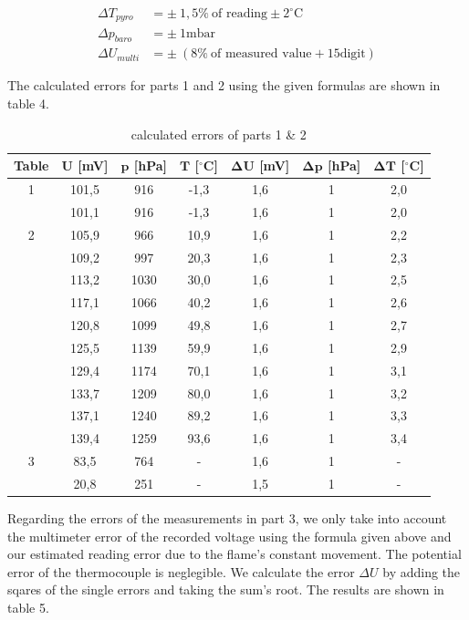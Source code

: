 \documentclass{article}
\begin{document}
\begin{equation}
    \begin{split}
        \Delta T_{pyro} &= \pm \ 1,5 \% \ \text{of reading} \pm 2^{\circ}\text{C} \\
        \Delta p_{baro} &= \pm \ 1 \text{mbar} \\
        \Delta U_{multi} &= \pm \ (8\% \ \text{of measured value} + 15 \text{digit})
    \end{split}
\end{equation}

The calculated errors for parts 1 and 2 using the given formulas are shown in table 4.

\begin{table}[!ht]
    \centering
    \begin{tabular}{c|c|c|c|c|c|c}
        \textbf{Table} & $\bm{U}$ [mV] & $\bm{p}$ [hPa] & $\bm{T}$ [$^{\circ}$C] & $\bm{\Delta U}$ [mV] & $\bm{\Delta p}$ [hPa] & $\bm{\Delta T}$ [$^{\circ}$C] \\ \hline
        1 & 101,5 & 916 & -1,3 & 1,6 & 1 & 2,0 \\ 
        ~ & 101,1 & 916 & -1,3 & 1,6 & 1 & 2,0 \\ \hline
        2 & 105,9 & 966 & 10,9 & 1,6 & 1 & 2,2 \\ 
        ~ & 109,2 & 997 & 20,3 & 1,6 & 1 & 2,3 \\ 
        ~ & 113,2 & 1030 & 30,0 & 1,6 & 1 & 2,5 \\ 
        ~ & 117,1 & 1066 & 40,2 & 1,6 & 1 & 2,6 \\ 
        ~ & 120,8 & 1099 & 49,8 & 1,6 & 1 & 2,7 \\ 
        ~ & 125,5 & 1139 & 59,9 & 1,6 & 1 & 2,9 \\ 
        ~ & 129,4 & 1174 & 70,1 & 1,6 & 1 & 3,1 \\ 
        ~ & 133,7 & 1209 & 80,0 & 1,6 & 1 & 3,2 \\ 
        ~ & 137,1 & 1240 & 89,2 & 1,6 & 1 & 3,3 \\ 
        ~ & 139,4 & 1259 & 93,6 & 1,6 & 1 & 3,4 \\ \hline
        3 & 83,5 & 764 & - & 1,6 & 1 & - \\ 
        ~ & 20,8 & 251 & - & 1,5 & 1 & - \\ 
    \end{tabular}
    \caption{calculated errors of parts 1 \& 2}
\end{table}

Regarding the errors of the measurements in part 3, we only take into account the multimeter error of the recorded voltage using the formula given above and our estimated reading error due to the flame's constant movement. The potential error of the thermocouple is neglegible. We calculate the error $\Delta U$ by adding the sqares of the single errors and taking the sum's root. The results are shown in table 5.
\end{document}
